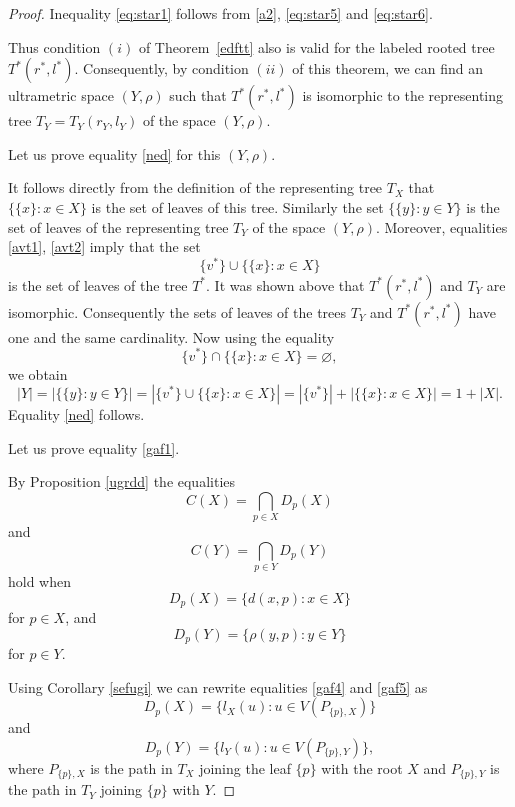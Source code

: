 \documentclass[10pt,a4paper]{amsart}
\begin{document}
\begin{proof}
Inequality \eqref{eq:star1} follows from \eqref{a2}, \eqref{eq:star5} and \eqref{eq:star6}.




Thus condition $(i)$ of Theorem~\ref{edftt} also is valid for the labeled rooted tree \(T^*(r^*,l^*)\). Consequently, by condition $(ii)$ of this theorem, we can find an ultrametric space \((Y,\rho)\) such that \(T^*(r^*,l^*)\) is isomorphic to the representing tree $T_Y=T_Y(r_Y,l_Y)$ of the space $(Y,\rho)$.


Let us prove equality \eqref{ned} for this $(Y,\rho)$. 


It follows directly from the 
 definition of the representing tree $T_X$ that $\{\{x\}: x \in X\}$ is the set of leaves of this tree. 
Similarly the set $\{\{y\}: y \in Y\}$ is the set of leaves of the representing tree $T_Y$ of the space $(Y,\rho)$. 
Moreover, equalities \eqref{avt1}, \eqref{avt2} imply that the set
\[
\{v^*\} \cup \{\{x\}: x \in X\}
\]
  is the set of leaves of the tree $T^{*}$.
It was shown above that $T^{*}(r^{*},l^{*})$ and $T_Y$ are isomorphic. 
Consequently the sets of leaves of the trees $T_Y$ and $T^{*}(r^{*},l^{*})$ have one and the same cardinality.
Now using the equality
\[
\{v^*\} \cap \{\{x\}: x \in X\}=\varnothing,
\]
we obtain
\[
|Y|
=
\left|\{\{y\}: y\in Y\}\right|
=
\left|\{v^*\}\cup \{\{x\}: x\in X\}\right|
=
\left|\{v^*\}\right|
+
\left|\{\{x\}: x\in X\}\right|
=
1+|X|.
\]
Equality \eqref{ned} follows.

Let us prove equality \eqref{gaf1}.





By Proposition \ref{ugrdd} the equalities 
\begin{equation}\label{gaf2}
C(X) = \bigcap_{p \in X} D_p(X) 
\end{equation}
and
\begin{equation}\label{gaf3}
C(Y) = \bigcap_{p \in Y} D_p(Y) 
\end{equation}
hold when
\begin{equation}\label{gaf4}
 D_p(X) =\{d(x,p)\colon x\in X\}
\end{equation}
for $p\in X$, and
\begin{equation}\label{gaf5}
 D_p(Y) =\{\rho(y,p)\colon y\in Y\}
\end{equation}
for $p\in Y$.


Using Corollary \ref{sefugi} we can rewrite equalities \eqref{gaf4} and \eqref{gaf5} as
\begin{equation*}
D_p(X) = \{ l_X(u) : u \in V(P_{\{p\},X}) \} 
\end{equation*}
and
\begin{equation*}
D_p(Y) = \{ l_Y(u) : u \in V(P_{\{p\},Y}) \},
\end{equation*}
where \(P_{\{p\},X}\) is the path in \(T_X\) joining the leaf \(\{p\}\) with the root \(X\) and \(P_{\{p\},Y}\) is the path in \(T_Y\) joining \(\{p\}\) with \(Y\).


\end{proof}
\end{document}
